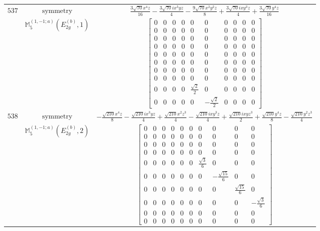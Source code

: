 \documentclass[fleqn,8pt,landscape]{jsarticle}
\begin{document}
\begin{longtable}{ccc}
$ 537 $ & $ \text{symmetry} $ & $ \frac{3 \sqrt{70} x^{4} z}{16} - \frac{3 \sqrt{70} i x^{3} y z}{4} - \frac{9 \sqrt{70} x^{2} y^{2} z}{8} + \frac{3 \sqrt{70} i x y^{3} z}{4} + \frac{3 \sqrt{70} y^{4} z}{16} $ \\
$  $ & $ \mathbb{M}_{5}^{(1,-1;a)}(E_{2g}^{(b)},1) $ & $ \begin{bmatrix} 0 & 0 & 0 & 0 & 0 & 0 & 0 & 0 & 0 & 0 \\ 0 & 0 & 0 & 0 & 0 & 0 & 0 & 0 & 0 & 0 \\ 0 & 0 & 0 & 0 & 0 & 0 & 0 & 0 & 0 & 0 \\ 0 & 0 & 0 & 0 & 0 & 0 & 0 & 0 & 0 & 0 \\ 0 & 0 & 0 & 0 & 0 & 0 & 0 & 0 & 0 & 0 \\ 0 & 0 & 0 & 0 & 0 & 0 & 0 & 0 & 0 & 0 \\ 0 & 0 & 0 & 0 & 0 & 0 & 0 & 0 & 0 & 0 \\ 0 & 0 & 0 & 0 & 0 & 0 & 0 & 0 & 0 & 0 \\ 0 & 0 & 0 & 0 & \frac{\sqrt{2}}{2} & 0 & 0 & 0 & 0 & 0 \\ 0 & 0 & 0 & 0 & 0 & - \frac{\sqrt{2}}{2} & 0 & 0 & 0 & 0 \end{bmatrix} $ \\ \hline
$ 538 $ & $ \text{symmetry} $ & $ - \frac{\sqrt{210} x^{4} z}{8} - \frac{\sqrt{210} i x^{3} y z}{4} + \frac{\sqrt{210} x^{2} z^{3}}{4} - \frac{\sqrt{210} i x y^{3} z}{4} + \frac{\sqrt{210} i x y z^{3}}{2} + \frac{\sqrt{210} y^{4} z}{8} - \frac{\sqrt{210} y^{2} z^{3}}{4} $ \\
$  $ & $ \mathbb{M}_{5}^{(1,-1;a)}(E_{2g}^{(b)},2) $ & $ \begin{bmatrix} 0 & 0 & 0 & 0 & 0 & 0 & 0 & 0 & 0 & 0 \\ 0 & 0 & 0 & 0 & 0 & 0 & 0 & 0 & 0 & 0 \\ 0 & 0 & 0 & 0 & 0 & 0 & 0 & 0 & 0 & 0 \\ 0 & 0 & 0 & 0 & 0 & 0 & 0 & 0 & 0 & 0 \\ 0 & 0 & 0 & 0 & 0 & 0 & \frac{\sqrt{3}}{6} & 0 & 0 & 0 \\ 0 & 0 & 0 & 0 & 0 & 0 & 0 & - \frac{\sqrt{15}}{6} & 0 & 0 \\ 0 & 0 & 0 & 0 & 0 & 0 & 0 & 0 & \frac{\sqrt{15}}{6} & 0 \\ 0 & 0 & 0 & 0 & 0 & 0 & 0 & 0 & 0 & - \frac{\sqrt{3}}{6} \\ 0 & 0 & 0 & 0 & 0 & 0 & 0 & 0 & 0 & 0 \\ 0 & 0 & 0 & 0 & 0 & 0 & 0 & 0 & 0 & 0 \end{bmatrix} $ \\ \hline

\end{longtable}
\end{document}
